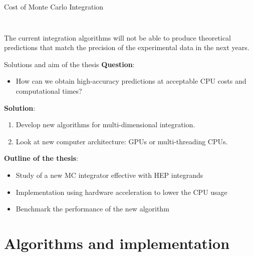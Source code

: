\documentclass[t,handout,professionalfont,serif]{beamer}
\begin{document}
\begin{frame}{Cost of Monte Carlo Integration}
\begin{columns}
\begin{column}{0.5 \textwidth}
\begin{figure}[h]
		\label{CPU1 cost}
	\end{figure}
\end{column}
\end{columns}
The current integration algorithms  will not be able to produce theoretical predictions that match the precision of the experimental data in the next years.
	\end{frame}

\begin{frame}{Solutions and aim of the thesis}
	\scriptsize
		\textbf{Question}:
		\begin{itemize}
			\item How can we obtain high-accuracy predictions 
			at acceptable CPU costs and computational times?
		\end{itemize}



	
	\vspace{0.5cm}
	\textbf{Solution}:
	\begin{enumerate}
		\item Develop new algorithms for multi-dimensional integration.
		\item Look at new computer architecture: GPUs or multi-threading CPUs. 
	\end{enumerate}
		\vspace{0.5cm}
\textbf{Outline of the thesis}:
\begin{itemize}
	\item Study of  a new MC integrator effective with HEP integrands
	\item Implementation using hardware acceleration to lower the CPU usage
	\item Benchmark the performance of the new algorithm
\end{itemize}
\end{frame}
\section{Algorithms and implementation}
\end{document}
